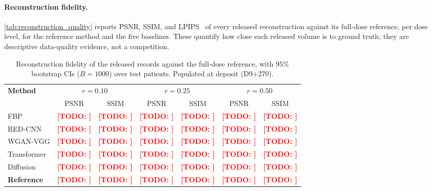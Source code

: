 \documentclass{article}
\newcommand{\todo}[1]{\textcolor{red}{\textbf{[TODO: #1]}}}
\begin{document}
\paragraph{Reconstruction fidelity.} \autoref{tab:reconstruction_quality}
reports PSNR, SSIM, and LPIPS~\citep{zhang2018lpips} of every released
reconstruction against its full-dose reference, per dose level, for the
reference method and the five baselines. These quantify how close each
released volume is to ground truth; they are descriptive data-quality
evidence, not a competition.

\begin{table}[h]
    \centering
    \small
    \setlength{\tabcolsep}{4pt}
    \begin{tabular}{lcccccc}
        \toprule
        \textbf{Method} & \multicolumn{2}{c}{$r = 0.10$} & \multicolumn{2}{c}{$r = 0.25$} & \multicolumn{2}{c}{$r = 0.50$} \\
        & PSNR & SSIM & PSNR & SSIM & PSNR & SSIM \\
        \midrule
        FBP                & \todo{} & \todo{} & \todo{} & \todo{} & \todo{} & \todo{} \\
        RED-CNN            & \todo{} & \todo{} & \todo{} & \todo{} & \todo{} & \todo{} \\
        WGAN-VGG           & \todo{} & \todo{} & \todo{} & \todo{} & \todo{} & \todo{} \\
        Transformer        & \todo{} & \todo{} & \todo{} & \todo{} & \todo{} & \todo{} \\
        Diffusion          & \todo{} & \todo{} & \todo{} & \todo{} & \todo{} & \todo{} \\
        \textbf{Reference} & \todo{} & \todo{} & \todo{} & \todo{} & \todo{} & \todo{} \\
        \bottomrule
    \end{tabular}
    \caption{Reconstruction fidelity of the released records against the
    full-dose reference, with $95\%$ bootstrap CIs ($B{=}1000$) over test
    patients. Populated at deposit (D9+270).}
    \label{tab:reconstruction_quality}
\end{table}
\end{document}
